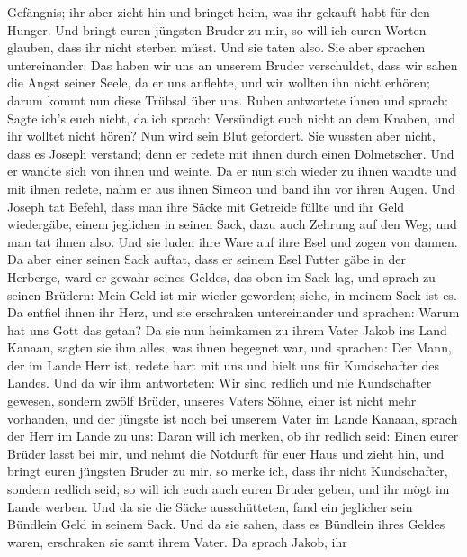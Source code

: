 Gefängnis; ihr aber zieht hin und bringet heim, was ihr gekauft habt für
den Hunger.  Und bringt euren jüngsten Bruder zu mir, so
will ich euren Worten glauben, dass ihr nicht sterben müsst. Und sie
taten also.  Sie aber sprachen untereinander: Das haben wir
uns an unserem Bruder verschuldet, dass wir sahen die Angst seiner
Seele, da er uns anflehte, und wir wollten ihn nicht erhören; darum
kommt nun diese Trübsal über uns.  Ruben antwortete ihnen
und sprach: Sagte ich's euch nicht, da ich sprach: Versündigt euch nicht
an dem Knaben, und ihr wolltet nicht hören? Nun wird sein Blut
gefordert.  Sie wussten aber nicht, dass es Joseph
verstand; denn er redete mit ihnen durch einen Dolmetscher.
 Und er wandte sich von ihnen und weinte. Da er nun sich
wieder zu ihnen wandte und mit ihnen redete, nahm er aus ihnen Simeon
und band ihn vor ihren Augen.  Und Joseph tat Befehl, dass
man ihre Säcke mit Getreide füllte und ihr Geld wiedergäbe, einem
jeglichen in seinen Sack, dazu auch Zehrung auf den Weg; und man tat
ihnen also.  Und sie luden ihre Ware auf ihre Esel und
zogen von dannen.  Da aber einer seinen Sack auftat, dass
er seinem Esel Futter gäbe in der Herberge, ward er gewahr seines
Geldes, das oben im Sack lag,  und sprach zu seinen
Brüdern: Mein Geld ist mir wieder geworden; siehe, in meinem Sack ist
es. Da entfiel ihnen ihr Herz, und sie erschraken untereinander und
sprachen: Warum hat uns Gott das getan?  Da sie nun
heimkamen zu ihrem Vater Jakob ins Land Kanaan, sagten sie ihm alles,
was ihnen begegnet war, und sprachen:  Der Mann, der im
Lande Herr ist, redete hart mit uns und hielt uns für Kundschafter des
Landes.  Und da wir ihm antworteten: Wir sind redlich und
nie Kundschafter gewesen,  sondern zwölf Brüder, unseres
Vaters Söhne, einer ist nicht mehr vorhanden, und der jüngste ist noch
bei unserem Vater im Lande Kanaan,  sprach der Herr im
Lande zu uns: Daran will ich merken, ob ihr redlich seid: Einen eurer
Brüder lasst bei mir, und nehmt die Notdurft für euer Haus und zieht
hin,  und bringt euren jüngsten Bruder zu mir, so merke
ich, dass ihr nicht Kundschafter, sondern redlich seid; so will ich euch
auch euren Bruder geben, und ihr mögt im Lande werben.  Und
da sie die Säcke ausschütteten, fand ein jeglicher sein Bündlein Geld in
seinem Sack. Und da sie sahen, dass es Bündlein ihres Geldes waren,
erschraken sie samt ihrem Vater.  Da sprach Jakob, ihr
